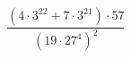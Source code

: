\begin{ex}[type=calculate]
	\begin{condition}
		\( \dfrac{(4\cdot3^{22}+7\cdot3^{21})\cdot57}{(19\cdot27^4)^2} \)
	\end{condition}
\end{ex}